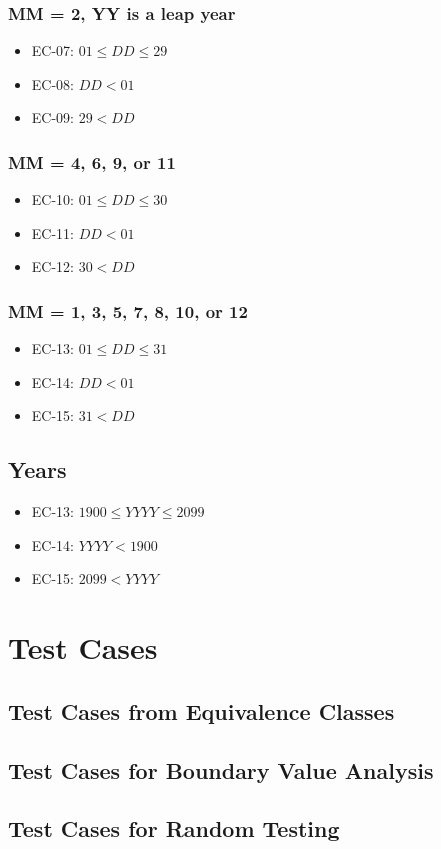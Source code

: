 \documentclass[11pt, oneside]{article}   	%
\begin{document}
\subsubsection{MM = 2, YY is a leap year}
	\begin{itemize}
		\item{EC-07: $01 \leq DD \leq 29$}
		\item{EC-08: $DD < 01$}
		\item{EC-09: $29 < DD$}
	\end{itemize}	
	
\subsubsection{MM = 4, 6, 9, or 11}
	\begin{itemize}
		\item{EC-10: $01 \leq DD \leq 30$}
		\item{EC-11: $DD < 01$}
		\item{EC-12: $30 < DD$}
	\end{itemize}
	
\subsubsection{MM = 1, 3, 5, 7, 8, 10, or 12}
	\begin{itemize}
		\item{EC-13: $01 \leq DD \leq 31$}
		\item{EC-14: $DD < 01$}
		\item{EC-15: $31 < DD$}
	\end{itemize}

\subsection{Years}
	\begin{itemize}
		\item{EC-13: $1900 \leq YYYY \leq 2099$}
		\item{EC-14: $YYYY < 1900$}
		\item{EC-15: $2099 < YYYY$}
	\end{itemize}

\section{Test Cases}
\subsection{Test Cases from Equivalence Classes}
\subsection{Test Cases for Boundary Value Analysis}
\subsection{Test Cases for Random Testing}
\end{document}
